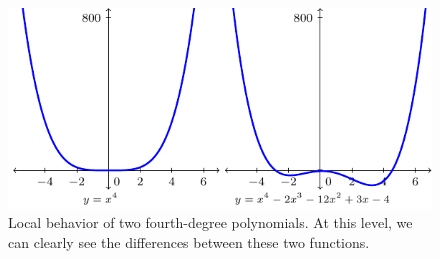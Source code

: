 \begin{figure}[ht!]
	\begin{center}
        \includegraphics[width=0.8\columnwidth]{figures/0-6-fig3.pdf}
	\end{center}      
\caption{Local behavior of two fourth-degree polynomials.  At this level, we can clearly see the differences between these two functions.}
\label{F:0.6.PolyEndBehavior}
\end{figure}

